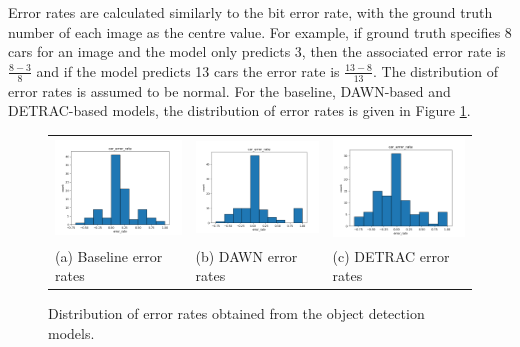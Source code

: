 \documentclass[]{article}
\begin{document}
	Error rates are calculated similarly to the bit error rate, with the ground truth number of each image as the centre value. For example, if ground truth specifies 8 cars for an image and the model only predicts 3, then the associated error rate is $\frac{8-3}{8}$ and if the model predicts 13 cars the error rate is $\frac{13-8}{13}$. The distribution of error rates is assumed to be normal. For the baseline, DAWN-based and DETRAC-based models, the distribution of error rates is given in Figure \ref{fig:error-rate-distributions}.
	
	\begin{figure}[H]
		\centering
		\begin{tabular}{lll}
			\includegraphics[width=60mm]{base_scenario_norm_car.png} & \includegraphics[width=60mm]{DAWN_scenario_norm_car.png} & \includegraphics[width=60mm]{DETRAC_scenario_norm_car.png} \\
			(a) Baseline error rates & (b) DAWN error rates  &  (c) DETRAC error rates
		\end{tabular}
		\caption{Distribution of error rates obtained from the object detection models.}
		\label{fig:error-rate-distributions}
	\end{figure}
	
\end{document}
